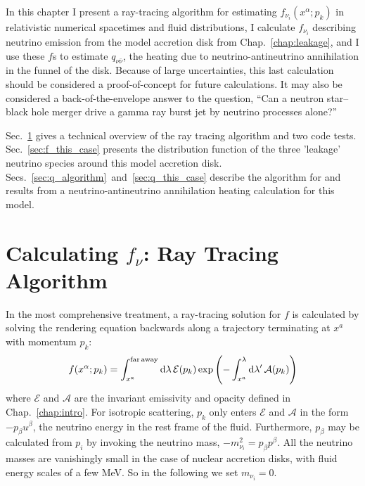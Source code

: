 In this chapter I present a ray-tracing algorithm for estimating
$f_{\nu_i}(x^\alpha;p_k)$ in relativistic numerical spacetimes and fluid
distributions, I calculate $f_{\nu_i}$ describing neutrino
emission from the model accretion disk from Chap.~\ref{chap:leakage},
and I use these $f$s to estimate $q_{\nu\bar{\nu}}$, the heating due to
neutrino-antineutrino annihilation in the funnel of the disk.
Because of large uncertainties,
this last calculation should be considered a proof-of-concept for future
calculations. It may also be considered a back-of-the-envelope answer to
the question, ``Can a neutron star--black hole merger drive a gamma ray burst
jet by neutrino processes alone?''

Sec.~\ref{sec:f_algorithm} gives a technical overview of the ray tracing
algorithm and two code tests. Sec.~\ref{sec:f_this_case} presents the distribution
function of the three 'leakage' neutrino species around this model accretion
disk. Secs.~\ref{sec:q_algorithm}~and~\ref{sec:q_this_case} describe the
algorithm for and results from a neutrino-antineutrino annihilation heating
calculation for this model.

\section{Calculating $f_\nu$: Ray Tracing Algorithm}
\label{sec:f_algorithm}

In the most comprehensive treatment, a ray-tracing solution for $f$ is calculated
by solving the rendering equation backwards along a trajectory terminating at
$x^a$ with momentum $p_k$:
\begin{equation}
  \label{eqn:rendering}
  f(x^\alpha;p_k) = \int_{x^a}^{\rm far\,away} \mathrm{d} \lambda \, \mathcal{E}(p_k)
  \exp\left(-\int_{x^a}^\lambda  \mathrm{d} \lambda' \, \mathcal{A}(p_k)\right)
\end{equation}
where $\mathcal{E}$ and $\mathcal{A}$ are the invariant emissivity and opacity
defined in Chap.~\ref{chap:intro}.
For isotropic scattering, $p_k$ only enters $\mathcal{E}$ and $\mathcal{A}$ in the
form $-p_\beta u^\beta$, the neutrino energy in the rest frame of the fluid.
Furthermore, $p_\beta$ may be calculated from $p_i$ by invoking the neutrino mass,
$-m_{\nu_i}^2=p_\beta p^\beta$.
All the neutrino masses are vanishingly small in the case of nuclear
accretion disks, with fluid energy scales of a few MeV. So in the following we
set $m_{\nu_i}=0$.

